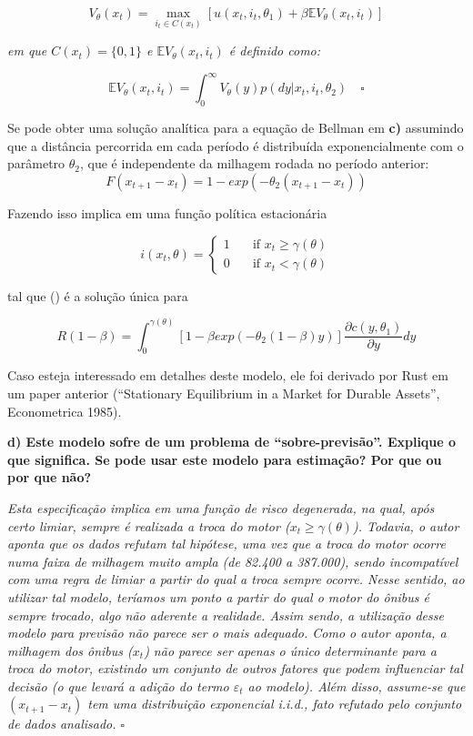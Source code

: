 \documentclass[12pt,a4paper]{article}
\begin{document}
\[
V_\theta(x_t) = \max_{i_t \in C(x_t)}[u(x_t,i_t,\theta_1)+\beta\mathbb{E}V_\theta(x_t,i_t)]
\]

\emph{em que \(C(x_t)=\{0,1\}\) e \(\mathbb{E}V_\theta(x_t,i_t)\) é
definido como:}

\[
\mathbb{E}V_\theta(x_t,i_t)=\int_0^\infty V_\theta(y)p(dy|x_t,i_t,\theta_2) \quad \square
\]

Se pode obter uma solução analítica para a equação de Bellman em
\textbf{c)} assumindo que a distância percorrida em cada período é
distribuída exponencialmente com o parâmetro \(\theta_2\), que é
independente da milhagem rodada no período anterior: \[
F(x_{t+1} - x_t) = 1 - exp(-\theta_2(x_{t+1} - x_t))
\]

Fazendo isso implica em uma função política estacionária

\[ i(x_t,\theta) = 
  \begin{cases}
    1    & \quad \text{if } x_t \ge \gamma(\theta) \\
    0    & \quad \text{if } x_t < \gamma(\theta)
  \end{cases}
\]

tal que \gamma(\theta) é a solução única para

\[R(1-\beta) = \int_0^{\gamma(\theta)}[1 - \beta exp(-\theta_2(1 - \beta)y)]\frac{\partial c(y,\theta_1)}{\partial y}dy\]

Caso esteja interessado em detalhes deste modelo, ele foi derivado por
Rust em um paper anterior (``Stationary Equilibrium in a Market for
Durable Assets'', Econometrica 1985).

\textbf{d) Este modelo sofre de um problema de ``sobre-previsão''.
Explique o que significa. Se pode usar este modelo para estimação? Por
que ou por que não?}

\emph{Esta especificação implica em uma função de risco degenerada, na
qual, após certo limiar, sempre é realizada a troca do motor
(\(x_t \ge \gamma(\theta)\)). Todavia, o autor aponta que os dados
refutam tal hipótese, uma vez que a troca do motor ocorre numa faixa de
milhagem muito ampla (de 82.400 a 387.000), sendo incompatível com uma
regra de limiar a partir do qual a troca sempre ocorre. Nesse sentido,
ao utilizar tal modelo, teríamos um ponto a partir do qual o motor do
ônibus é sempre trocado, algo não aderente a realidade. Assim sendo, a
utilização desse modelo para previsão não parece ser o mais adequado.
Como o autor aponta, a milhagem dos ônibus (\(x_t\)) não parece ser
apenas o único determinante para a troca do motor, existindo um conjunto
de outros fatores que podem influenciar tal decisão (o que levará a
adição do termo \(\varepsilon_t\) ao modelo). Além disso, assume-se que
\((x_{t+1}-x_t)\) tem uma distribuição exponencial i.i.d., fato refutado
pelo conjunto de dados analisado. \(\square\)}
\end{document}
